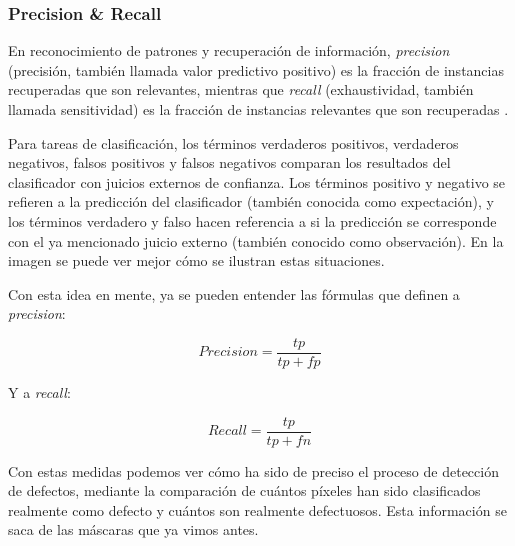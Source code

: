 \subsubsection{Precision \& Recall}
En reconocimiento de patrones y recuperación de información, \textit{precision} (precisión, también llamada valor predictivo positivo) es la fracción de instancias recuperadas que son relevantes, mientras que \textit{recall} (exhaustividad, también llamada sensitividad) es la fracción de instancias relevantes que son recuperadas \cite{wiki:precisionandrecall}.

Para tareas de clasificación, los términos verdaderos positivos, verdaderos negativos, falsos positivos y falsos negativos comparan los resultados del clasificador con juicios externos de confianza. Los términos positivo y negativo se refieren a la predicción del clasificador (también conocida como expectación), y los términos verdadero y falso hacen referencia a si la predicción se corresponde con el ya mencionado juicio externo (también conocido como observación). En la imagen  se puede ver mejor cómo se ilustran estas situaciones.


Con esta idea en mente, ya se pueden entender las fórmulas que definen a \textit{precision}:

\[Precision=\frac{tp}{tp+fp}\]

Y a \textit{recall}:

\[Recall=\frac{tp}{tp+fn}\]

Con estas medidas podemos ver cómo ha sido de preciso el proceso de detección de defectos, mediante la comparación de cuántos píxeles han sido clasificados realmente como defecto y cuántos son realmente defectuosos. Esta información se saca de las máscaras que ya vimos antes.